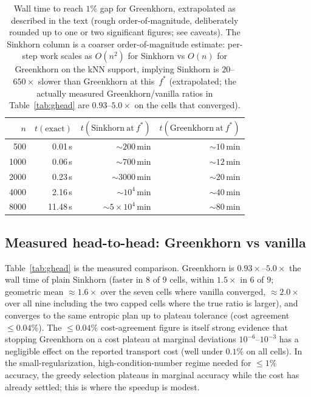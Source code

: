 \documentclass[11pt]{article}
\theoremstyle{remark}
\begin{document}
\begin{table}[t]
\centering
\small
\begin{tabular}{rrrr}
\toprule
$n$ & $t(\mathrm{exact})$ & $t(\mathrm{Sinkhorn\ at\ }f^*)$ & $t(\mathrm{Greenkhorn\ at\ }f^*)$ \\
\midrule
500  & 0.01\,s  & $\sim\!200$\,min   & $\sim\!10$\,min  \\
1000 & 0.06\,s  & $\sim\!700$\,min   & $\sim\!12$\,min  \\
2000 & 0.23\,s  & $\sim\!3000$\,min  & $\sim\!20$\,min  \\
4000 & 2.16\,s  & $\sim\!10^4$\,min  & $\sim\!40$\,min  \\
8000 & 11.48\,s & $\sim\!5{\times}10^4$\,min & $\sim\!80$\,min \\
\bottomrule
\end{tabular}
\caption{Wall time to reach $1\%$ gap for Greenkhorn, extrapolated as
  described in the text (rough order-of-magnitude, deliberately rounded up
  to one or two significant figures; see caveats). The Sinkhorn column is a
  coarser order-of-magnitude estimate: per-step work scales as $O(n^2)$ for
  Sinkhorn vs $O(n)$ for Greenkhorn on the kNN support, implying
  Sinkhorn is $20$--$650\times$ slower than Greenkhorn at this~$f^*$
  (extrapolated; the actually measured Greenkhorn/vanilla ratios in
  Table~\ref{tab:ghead} are $0.93$--$5.0\times$ on the cells that
  converged).}
\label{tab:target}
\end{table}

\subsection{Measured head-to-head: Greenkhorn vs vanilla}
Table~\ref{tab:ghead} is the measured comparison. Greenkhorn is
$0.93\times$--$5.0\times$ the wall time of plain Sinkhorn (faster in $8$
of $9$ cells, within $1.5\times$ in $6$ of $9$; geometric mean
$\approx 1.6\times$ over the seven cells where vanilla converged,
$\approx 2.0\times$ over all nine including the two capped cells where
the true ratio is larger), and converges to the same entropic plan up to
plateau tolerance (cost agreement $\le 0.04\%$). The $\le 0.04\%$
cost-agreement figure is itself strong evidence that stopping Greenkhorn
on a cost plateau at marginal deviations $10^{-6}$--$10^{-3}$ has a
negligible effect on the reported transport cost (well under $0.1\%$ on
all cells). In the small-regularization, high-condition-number regime
needed for $\le 1\%$ accuracy, the greedy selection plateaus in marginal
accuracy while the cost has already settled; this is where the speedup is
modest.
\end{document}
